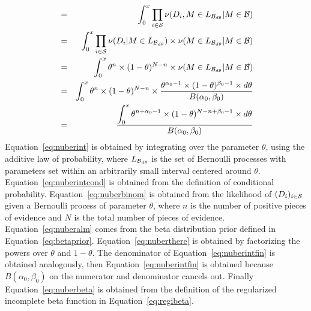 \documentclass[]{article}
\begin{document}
\begin{eqnarray}
  & = &
  \displaystyle
  \int_0^x
  \prod_{i\in \mathcal{S}}
  \nu(D_{i}, M \in L_{\mathcal{B}_{d\theta}} | M \in \mathcal{B})
  \label{eq:nuberint}\\
  & = &
  \displaystyle
  \int_0^x
  \prod_{i\in \mathcal{S}}
  \nu(D_{i} | M \in L_{\mathcal{B}_{d\theta}})
  \times
  \nu(M \in L_{\mathcal{B}_{d\theta}} | M \in \mathcal{B})
  \label{eq:nuberintcond}\\
  & = &
  \displaystyle
  \int_0^x
  \theta^n \times (1-\theta)^{N-n}
  \times
  \nu(M \in L_{\mathcal{B}_{d\theta}} | M \in \mathcal{B})
  \label{eq:nuberbinom}\\
  & = &
  \int_0^x
  \displaystyle
  \theta^n \times (1-\theta)^{N-n}
  \times
  \frac{
    \theta^{\alpha_0 - 1} \times (1-\theta)^{\beta_0 - 1} \times
    d\theta}
       {B(\alpha_0, \beta_0)}
  \label{eq:nuberalm}\\
  & = &
  \frac{
    \displaystyle
    \int_0^x
    \theta^{n + \alpha_0 - 1} \times (1-\theta)^{N-n + \beta_0 - 1}
    \times d\theta}
       {B(\alpha_0, \beta_0)}
  \label{eq:nuberthere}
\end{eqnarray}
Equation~\ref{eq:nuberint} is obtained by integrating over the
parameter $\theta$, using the additive law of probability, where
$L_{\mathcal{B}_{d\theta}}$ is the set of Bernoulli processes with parameters
set within an arbitrarily small interval centered around $\theta$.
Equation~\ref{eq:nuberintcond} is obtained from the definition of
conditional probability.  Equation~\ref{eq:nuberbinom} is obtained
from the likelihood of $(D_{i})_{i\in \mathcal{S}}$ given a Bernoulli
process of parameter $\theta$, where $n$ is the number of positive
pieces of evidence and $N$ is the total number of pieces of evidence.
Equation~\ref{eq:nuberalm} comes from the beta distribution prior
defined in Equation~\ref{eq:betaprior}.  Equation~\ref{eq:nuberthere}
is obtained by factorizing the powers over $\theta$ and $1-\theta$.
The denominator of Equation~\ref{eq:nuberintfin} is obtained
analogously, then Equation~\ref{eq:nuberintfin} is obtained because
$B(\alpha_0, \beta_0)$ on the numerator and denominator cancels out.
Finally Equation~\ref{eq:nuberbeta} is obtained from the definition of
the regularized incomplete beta function in
Equation~\ref{eq:regibeta}.
\end{document}
